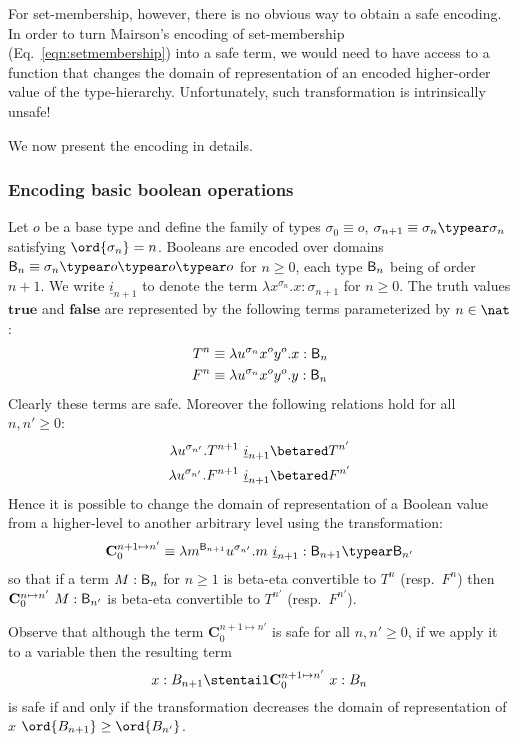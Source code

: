 For set-membership, however, there is no obvious way to obtain a safe encoding. In order to turn Mairson's encoding of set-membership (Eq.\ \ref{eqn:setmembership}) into a safe term, we would need to have access to a function that changes the domain of representation of an encoded higher-order value of the type-hierarchy. Unfortunately, such transformation is intrinsically unsafe!
\smallskip

We now present the encoding in details.

\subsubsection{Encoding basic boolean operations}

Let $o$ be a base type and define the family of types $\sigma_0
\equiv o$, $\sigma_{n+1} \equiv \sigma_n\typear\sigma_n$ satisfying
$\ord{\sigma_n} = n$. Booleans are encoded over domains $\booltype_n
\equiv \sigma_n\typear o\typear o\typear o$ for $n\geq0$, each type
$\mathsf{B}_n$ being of order $n+1$. We write $\underline{i}_{n+1}$
to denote the term $\lambda x^{\sigma_n}.x : \sigma_{n+1}$ for
$n\geq0$. The truth values $\mathbf{true}$ and $\mathbf{false}$ are
represented by the following terms parameterized by $n \in \nat$:
\begin{align*}
  T^n &\equiv \lambda u^{\sigma_n} x^o y^o .x : \mathsf{B}_{n}\\
  F^n &\equiv \lambda u^{\sigma_n} x^o y^o .y : \mathsf{B}_{n}
\end{align*}
Clearly these terms are safe. Moreover the following relations hold
for all $n,n'\geq 0$:
\begin{align*}
  \lambda u^{\sigma_{n'}} . T^{n+1}~\underline{i}_{n+1}  &\betared  T^{n'} \\
  \lambda u^{\sigma_{n'}} . F^{n+1}~\underline{i}_{n+1}  &\betared  F^{n'}
\end{align*}
Hence it is possible to change the domain of representation of a Boolean value from a higher-level to another arbitrary level using the transformation:
$$ \mathbf{C}^{n+1\mapsto n'}_0 \equiv \lambda m^{\booltype_{n+1}} u^{\sigma_{n'}}. m~\underline{i}_{n+1} : \booltype_{n+1} \typear \booltype_{n'}$$
so that if a term $M : \mathsf{B}_n$ for $n\geq1$ is beta-eta convertible to $T^n$ (resp.\ $F^n$) then $\mathbf{C}^{n\mapsto n'}_0~M :\mathsf{B}_{n'}$ is beta-eta convertible to $T^{n'}$ (resp.\ $F^{n'}$).

Observe that although the term $\mathbf{C}^{n+1\mapsto n'}_0$ is safe for all $n,n'\geq 0$, if we apply it to a variable then the resulting term
$$ x:B_{n+1} \stentail \mathbf{C}_0^{n+1\mapsto n'}~x : B_{n}$$
is safe if and only if the transformation decreases the domain of representation of $x$ \ie $\ord{B_{n+1}}\geq\ord{B_{n'}}$.


